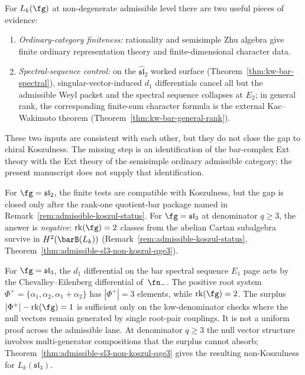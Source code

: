 \begin{remark}
\label{rem:two-routes-admissible-koszul}
For $L_k(\fg)$ at non-degenerate admissible level there are two
useful pieces of evidence:
\begin{enumerate}[label=\textup{(\roman*)}]
\item \emph{Ordinary-category finiteness:}
 rationality and semisimple Zhu algebra give finite ordinary
 representation theory and finite-dimensional character data.
\item \emph{Spectral-sequence control:}
 on the $\widehat{\mathfrak{sl}}_2$ worked surface
 \textup{(}Theorem~\ref{thm:kw-bar-spectral}\textup{)},
 singular-vector-induced $d_1$ differentials cancel all but the
 admissible Weyl packet and the spectral sequence collapses at
 $E_2$; in general rank, the corresponding finite-sum character
 formula is the external Kac--Wakimoto theorem
 \textup{(}Theorem~\ref{thm:kw-bar-general-rank}\textup{)}.
\end{enumerate}
These two inputs are consistent with each other, but they do not
close the gap to chiral Koszulness. The missing step is an
identification of the bar-complex Ext theory with the Ext theory of
the semisimple ordinary admissible category; the present manuscript
does not supply that identification.

For $\fg = \mathfrak{sl}_2$, the finite tests are compatible with
Koszulness, but the gap is closed only after the rank-one
quotient-bar package named in
Remark~\textup{\ref{rem:admissible-koszul-status}}.
For $\fg = \mathfrak{sl}_3$ at denominator $q \geq 3$, the answer is
\emph{negative}: $\mathrm{rk}(\fg) = 2$ classes from the abelian Cartan
subalgebra survive in $H^2(\barB(L_k))$
\textup{(}Remark~\textup{\ref{rem:admissible-koszul-status}},
Theorem~\textup{\ref{thm:admissible-sl3-non-koszul-qge3}}\textup{)}.
\end{remark}

\begin{remark}
\label{rem:admissible-sl3-structural}
For $\fg = \mathfrak{sl}_3$, the $d_1$ differential on the
bar spectral sequence $E_1$ page acts by the Chevalley--Eilenberg
differential of~$\fn_-$. The positive root system
$\Phi^+ = \{\alpha_1, \alpha_2, \alpha_1{+}\alpha_2\}$ has
$|\Phi^+| = 3$ elements, while $\mathrm{rk}(\fg) = 2$. The
surplus $|\Phi^+| - \mathrm{rk}(\fg) = 1$ is sufficient only on the
low-denominator checks where the null vectors remain generated by
single root-pair couplings. It is not a uniform proof across the
admissible lane. At denominator $q \geq 3$ the null vector structure
involves multi-generator compositions that the surplus cannot absorb;
Theorem~\ref{thm:admissible-sl3-non-koszul-qge3} gives the resulting
non-Koszulness for $L_k(\mathfrak{sl}_3)$.
\end{remark}

